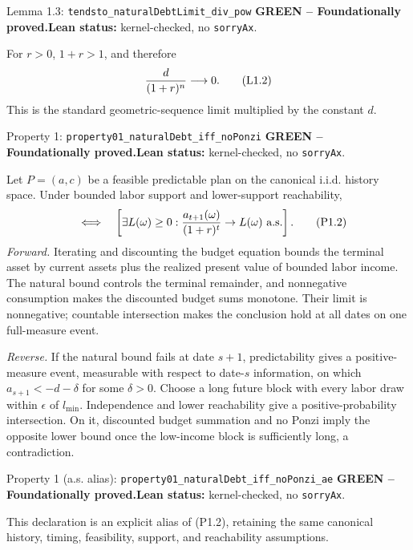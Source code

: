 \documentclass[11pt]{article}
\newcommand{\leanname}[1]{\nolinkurl{#1}}
\newcommand{\eqP}[1]{\refstepcounter{equation}\tag{P#1}}
\newcommand{\eqL}[1]{\refstepcounter{equation}\tag{L#1}}
\newcommand{\formalcheck}{\textbf{Lean status:} kernel-checked, no \texttt{sorryAx}.}
\newcommand{\greenstatus}{\textcolor{proved}{\textbf{GREEN -- Foundationally proved.}}}
\begin{document}
\begin{greenbox}{Lemma 1.3: \leanname{tendsto_naturalDebtLimit_div_pow}}
\greenstatus\quad\formalcheck

For \(r>0\), \(1+r>1\), and therefore
\begin{equation}
 \frac{d}{(1+r)^n}\longrightarrow0. \eqL{1.2}\label{L1.2}
\end{equation}
This is the standard geometric-sequence limit multiplied by the constant
\(d\).
\end{greenbox}

\begin{greenbox}{Property 1: \leanname{property01_naturalDebt_iff_noPonzi}}
\greenstatus\quad\formalcheck

Let \(P=(a,c)\) be a feasible predictable plan on the canonical i.i.d.
history space.  Under bounded labor support and lower-support reachability,
\begin{equation}
 [a_t\ge-d\ \hbox{for every }t\ \hbox{a.s.}]\quad\Longleftrightarrow\quad
 \left[\exists L(\omega)\ge0:\frac{a_{t+1}(\omega)}{(1+r)^t}
 \to L(\omega)\ \hbox{a.s.}\right]. \eqP{1.2}\label{P1.2}
\end{equation}
\textit{Forward.}  Iterating and discounting the budget equation bounds the
terminal asset by current assets plus the realized present value of bounded
labor income.  The natural bound controls the terminal remainder, and
nonnegative consumption makes the discounted budget sums monotone.  Their
limit is nonnegative; countable intersection makes the conclusion hold at all
dates on one full-measure event.

\textit{Reverse.}  If the natural bound fails at date \(s+1\), predictability
gives a positive-measure event, measurable with respect to date-\(s\)
information, on which \(a_{s+1}<-d-\delta\) for some \(\delta>0\).  Choose a
long future block with every labor draw within \(\epsilon\) of \(l_{\min}\).
Independence and lower reachability give a positive-probability intersection.
On it, discounted budget summation and no Ponzi imply the opposite lower bound
once the low-income block is sufficiently long, a contradiction.
\end{greenbox}

\begin{greenbox}{Property 1 (a.s. alias): \leanname{property01_naturalDebt_iff_noPonzi_ae}}
\greenstatus\quad\formalcheck

This declaration is an explicit alias of (P1.2), retaining the same canonical
history, timing, feasibility, support, and reachability assumptions.
\end{greenbox}
\end{document}
